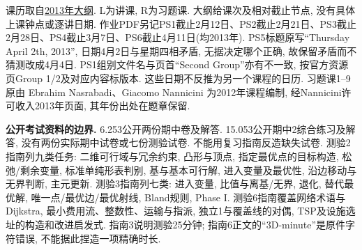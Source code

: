 课历取自\href{https://ocw.mit.edu/courses/15-053-optimization-methods-in-management-science-spring-2013/pages/syllabus/}{2013年大纲}.
L为讲课, R为习题课. 大纲给课次及相对截止节点, 没有具体上课钟点或逐讲日期.
作业PDF另记PS1截止2月12日、PS2截止2月21日、PS3截止2月28日、PS4截止3月7日、PS6截止4月11日(均2013年).
PS5标题原写“Thursday April 2th, 2013”, 日期4月2日与星期四相矛盾, 无据决定哪个正确, 故保留矛盾而不猜测改成4月4日.
PS1组别文件名与页首“Second Group”亦有不一致, 按官方资源页Group 1/2及对应内容标版本. 这些日期不反推为另一个课程的日历.
习题课1--9原由 Ebrahim Nasrabadi、Giacomo Nannicini 为2012年课程编制, 经Nannicini许可收入2013年页面, 其年份出处在题章保留.

\noindent\textbf{公开考试资料的边界.}
6.253公开两份期中卷及解答. 15.053公开期中2综合练习及解答, 没有两份实际期中试卷或七份测验试卷.
不能用复习指南反造缺失试卷. 测验2指南列九类任务: 二维可行域与冗余约束, 凸形与顶点, 指定最优点的目标构造, 松弛/剩余变量, 标准单纯形表判别, 基与基本可行解, 进入变量及最优性, 沿边移动与无界判断, 主元更新.
测验3指南列七类: 进入变量, 比值与离基/无界, 退化, 替代最优解, 唯一点/最优边/最优射线, Bland规则, Phase I.
测验6指南覆盖网络术语与Dijkstra, 最小费用流、整数性、运输与指派, 独立1与覆盖线的对偶, TSP及设施选址的构造和改进启发式.
指南3说明测验25分钟; 指南6正文的“3D-minute”是原件字符错误, 不能据此捏造一项精确时长.
